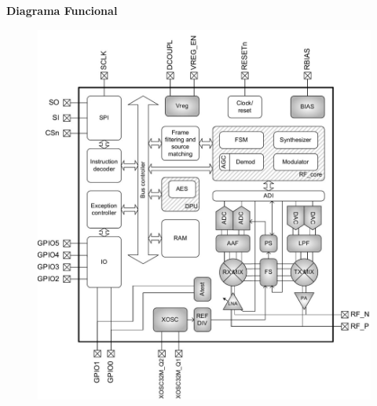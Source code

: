 \documentclass[aspectratio=169]{beamer}
\begin{document}
\begin{frame}{\textbf{Diagrama Funcional}}
\begin{minipage}[c]{1.0\linewidth}
\begin{figure}[H]
	\includegraphics[width=1\textwidth]{./imagenes/diagrama.jpg}
		\end{figure}	
\end{minipage}
\end{frame}
\end{document}
